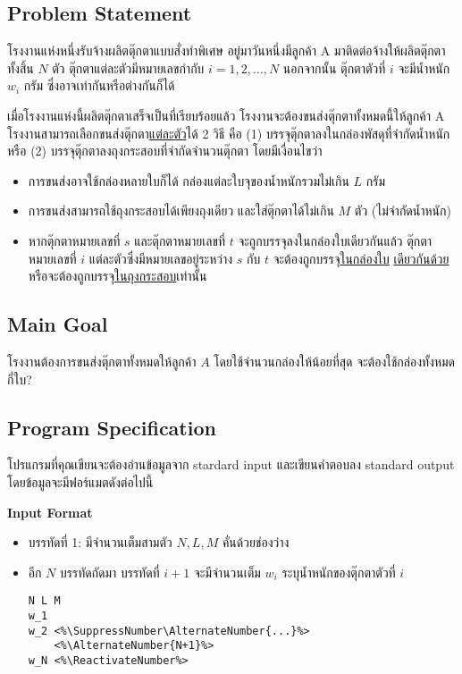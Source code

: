 
\subsection*{\sectionfont\upshape Problem Statement}

โรงงานแห่งหนึ่งรับจ้างผลิตตุ๊กตาแบบสั่งทำพิเศษ\;
อยู่มาวันหนึ่งมีลูกค้า A มาติดต่อจ้างให้ผลิตตุ๊กตาทั้งสิ้น $N$ ตัว\; 
ตุ๊กตาแต่ละตัวมีหมายเลขกำกับ $i = {1, 2}, \ldots, N$\;
นอกจากนั้น ตุ๊กตาตัวที่ $i$ จะมีน้ำหนัก $w_i$ กรัม ซึ่งอาจเท่ากันหรือต่างกันก็ได้

เมื่อโรงงานแห่งนี้ผลิตตุ๊กตาเสร็จเป็นที่เรียบร้อยแล้ว โรงงานจะต้องขนส่งตุ๊กตาทั้งหมดนี้ให้ลูกค้า A\;\;
โรงงานสามารถเลือกขนส่งตุ๊กตา\uline{แต่ละตัว}ได้ 2 วิธี คือ 
(1) บรรจุตุ๊กตาลงในกล่องพัสดุที่จำกัดน้ำหนัก หรือ 
(2) บรรจุตุ๊กตาลงถุงกระสอบที่จำกัดจำนวนตุ๊กตา โดยมีเงื่อนไขว่า
\begin{itemize}
\item การขนส่งอาจใช้กล่องหลายใบก็ได้ กล่องแต่ละใบจุของน้ำหนักรวมไม่เกิน $L$ กรัม
\item การขนส่งสามารถใช้ถุงกระสอบได้เพียงถุงเดียว และใส่ตุ๊กตาได้ไม่เกิน $M$ ตัว (ไม่จำกัดน้ำหนัก)
\item หากตุ๊กตาหมายเลขที่ $s$ และตุ๊กตาหมายเลขที่ $t$ จะถูกบรรจุลงในกล่องใบเดียวกันแล้ว 
    ตุ๊กตาหมายเลขที่ $i$ แต่ละตัวซึ่งมีหมายเลขอยู่ระหว่าง $s$ กับ $t$ 
    จะต้องถูกบรรจุ\uline{ในกล่องใบ} \uline{เดียวกันด้วย} หรือจะต้องถูกบรรจุ\uline{ในถุงกระสอบ}เท่านั้น
\end{itemize}

\subsection*{\sectionfont\upshape Main Goal}

โรงงานต้องการขนส่งตุ๊กตาทั้งหมดให้ลูกค้า $A$ โดยใช้จำนวนกล่องให้น้อยที่สุด จะต้องใช้กล่องทั้งหมดกี่ใบ?

\subsection*{\sectionfont\upshape Program Specification}

โปรแกรมที่คุณเขียนจะต้องอ่านข้อมูลจาก stardard input 
และเขียนคำตอบลง standard output โดยข้อมูลจะมีฟอร์แมตดังต่อไปนี้

\bigskip\noindent
{\sectionfont\bfseries Input Format}
\begin{itemize}
\item บรรทัดที่ 1: มีจำนวนเต็มสามตัว $N, L, M$ คั่นด้วยช่องว่าง
\item อีก $N$ บรรทัดถัดมา บรรทัดที่ $i+1$ จะมีจำนวนเต็ม $w_i$ ระบุน้ำหนักของตุ๊กตาตัวที่ $i$
\begin{lstlisting}
N L M
w_1
w_2 <%\SuppressNumber\AlternateNumber{...}%>
    <%\AlternateNumber{N+1}%>
w_N <%\ReactivateNumber%>
\end{lstlisting}
\end{itemize}

